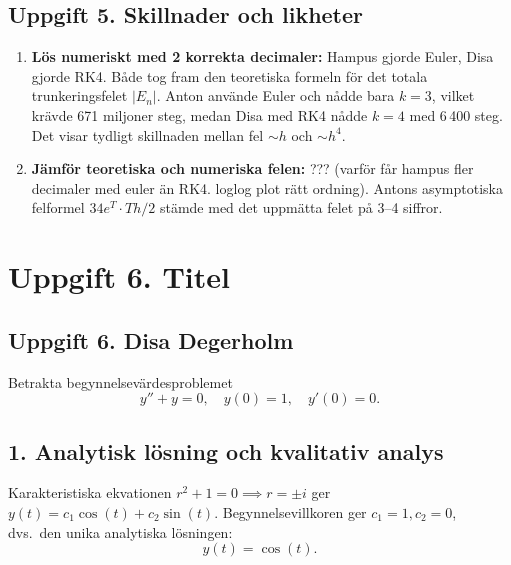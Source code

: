 \documentclass{article}
\begin{document}
\subsection*{Uppgift 5. Skillnader och likheter}

\begin{enumerate}
    \item \textbf{Lös numeriskt med 2 korrekta decimaler:} Hampus gjorde Euler, Disa gjorde RK4. Både tog fram den teoretiska formeln för det totala trunkeringsfelet $|E_n|$. Anton använde Euler och nådde bara $k = 3$, vilket krävde 671 miljoner steg,
    medan Disa med RK4 nådde $k = 4$ med 6\,400 steg. Det visar tydligt skillnaden
    mellan fel $\sim h$ och $\sim h^4$.
    \item \textbf{Jämför teoretiska och numeriska felen:} ??? (varför får hampus fler decimaler med euler än RK4. loglog plot rätt ordning). Antons asymptotiska felformel $34e^{T} \cdot Th/2$ stämde med det uppmätta felet
    på 3--4 siffror.
\end{enumerate}

\section*{Uppgift 6. Titel}

\subsection*{Uppgift 6. Disa Degerholm}


Betrakta begynnelsevärdesproblemet
\begin{equation}
    y'' + y = 0, \quad y(0) = 1, \quad y'(0) = 0.
\end{equation}

\subsection*{1. Analytisk lösning och kvalitativ analys}
Karakteristiska ekvationen $r^2 + 1 = 0 \implies r = \pm i$ ger $y(t) = c_1 \cos(t) + c_2 \sin(t)$. Begynnelsevillkoren ger $c_1 = 1, c_2 = 0$, dvs.\ den unika analytiska lösningen:
\begin{equation}
    y(t) = \cos(t).
\end{equation}
\end{document}
